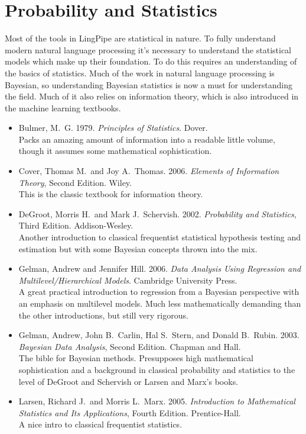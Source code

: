 \section{Probability and Statistics}

\noindent
Most of the tools in LingPipe are statistical in nature.  To fully
understand modern natural language processing it's necessary to
understand the statistical models which make up their foundation.
To do this requires an understanding of the basics of statistics.
Much of the work in natural language processing is Bayesian, so
understanding Bayesian statistics is now a must for understanding
the field.  Much of it also relies on information theory, which is
also introduced in the machine learning textbooks.

\begin{itemize}
%
\item
Bulmer, M.~G.
1979.
{\it Principles of Statistics}.
Dover.
\\
{\footnotesize Packs an amazing amount of information into
a readable little volume, though it assumes some mathematical
sophistication.}
%
\item Cover, Thomas M.\ and Joy A.\ Thomas.
2006.
{\it Elements of Information Theory}, Second Edition.
Wiley.
\\
{\footnotesize This is the classic textbook for information theory.}
%
\item
DeGroot, Morris H.\ and Mark J.\ Schervish.
2002.
{\it Probability and Statistics},  Third Edition.
Addison-Wesley.
\\
{\footnotesize Another introduction to classical frequentist
statistical hypothesis testing and estimation but with some Bayesian
concepts thrown into the mix.}
%
\item
Gelman, Andrew and Jennifer Hill.
2006.
{\it Data Analysis Using Regression and Multilevel/Hierarchical Models}.
Cambridge University Press.
\\
{\footnotesize A great practical introduction to regression from a Bayesian
perspective with an emphasis on multilevel models.  Much less mathematically
demanding than the other introductions, but still very rigorous.}
%
\item
Gelman, Andrew, John B.~Carlin, Hal S.\ Stern, and Donald B.\ Rubin.
2003.
{\it Bayesian Data Analysis}, Second Edition.
Chapman and Hall.
\\
{\footnotesize The bible for Bayesian methods.  Presupposes high
mathematical sophistication and a background in classical probability
and statistics to the level of DeGroot and Schervish or Larsen
and Marx's books.}
%
\item
Larsen, Richard J.\ and Morris L.\ Marx.
2005.
{\it Introduction to Mathematical Statistics and Its Applications}, Fourth Edition.
Prentice-Hall.
\\
{\footnotesize A nice intro to classical frequentist statistics.}
%
\end{itemize}


